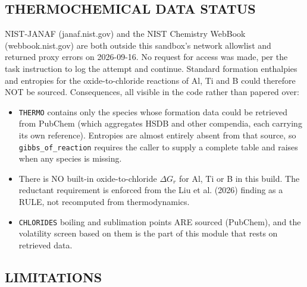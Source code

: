 \documentclass[10pt,a4paper,twoside]{report}
\begin{document}
\subsection*{THERMOCHEMICAL DATA STATUS}

NIST-JANAF (janaf.nist.gov) and the NIST Chemistry WebBook (webbook.nist.gov) are both outside this sandbox's network allowlist and returned proxy errors on 2026-09-16. No request for access was made, per the task instruction to log the attempt and continue. Standard formation enthalpies and entropies for the oxide-to-chloride reactions of Al, Ti and B could therefore NOT be sourced. Consequences, all visible in the code rather than papered over:

\begin{itemize}
\item \texttt{THERMO} contains only the species whose formation data could be retrieved from PubChem (which aggregates HSDB and other compendia, each carrying its own reference). Entropies are almost entirely absent from that source, so \texttt{gibbs\_of\_reaction} requires the caller to supply a complete table and raises when any species is missing.
\item There is NO built-in oxide-to-chloride $\Delta G_r$ for Al, Ti or B in this build. The reductant requirement is enforced from the Liu et al. (2026) finding as a RULE, not recomputed from thermodynamics.
\item \texttt{CHLORIDES} boiling and sublimation points ARE sourced (PubChem), and the volatility screen based on them is the part of this module that rests on retrieved data.
\end{itemize}

\subsection*{LIMITATIONS}
\end{document}
